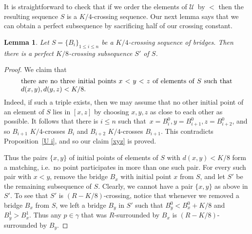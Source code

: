 \documentclass[a4paper]{article}
\newtheorem{lemma}[proposition]{Lemma}
\newcommand{\cu}{\ensuremath{\mathcal U}}
\newcommand{\Prr}[1]{Pro\-position~\ref{#1}}
\newcommand{\st}{such that}
\newcommand{\labtequ}[2]{\begin{equation} \label{#1} 	\begin{minipage}[c]{0.9\textwidth}  #2 \end{minipage} \ignorespacesafterend \end{equation} }
\begin{document}
\smallskip
It is straightforward to check that if we order the elements of \cu\ by $<$ then the resulting sequence $S$ is a $K/4$-crossing sequence. Our next lemma says that we can obtain a perfect subsequence by sacrificing half of our crossing constant.
\begin{lemma} \label{initials} 
Let $S= \{B_i\}_{1\leq i \leq n}$ be a $K/4$-crossing sequence of bridges.  Then there is a perfect $K/8$-crossing subsequence $S'$ of $S$. \end{lemma}
\begin{proof}
We claim that 
\labtequ{xyz}{there are no three  initial points $x < y < z$ of elements of $S$ \st\ $d(x,y), d(y,z) < K/8$.} Indeed, if such a triple exists, then we may assume that no other initial point of an element of $S$ lies in $[x,z]$ by choosing $x,y,z$ as close to each other as possible. It follows that there is $i\leq n$ \st\ $x= B_i^0, y= B_{i+1}^0, z= B_{i+2}^0$, and so $B_{i+1}$ $K/4$-crosses $B_i$ and $B_{i+2}$ $K/4$-crosses $B_{i+1}$. This contradicts \Prr{U i}, and so our claim \eqref{xyz} is proved.

Thus the pairs $\{x,y\}$ of initial points of elements of $S$ with $d(x,y) < K/8$ form a matching, i.e.\ no point participates in more than one such pair. For every such pair with $x<y$, remove the bridge $B_x$ with initial point $x$ from $S$, and let  $S'$ be the remaining subsequence of $S$. Clearly, we cannot have a pair $\{x,y\}$ as above in $S'$. To see that $S'$ is $(R-K/8)$-crossing, notice that whenever we removed a bridge $B_x$ from $S$, we left a bridge $B_y$ in $S'$ such that $B_y^0 < B_x^0 + K/8$ and  $B_y^1 > B_x^1$. Thus any $p\in \gamma$ that was $R$-surrounded by $B_x$ is $(R-K/8)$-surrounded by $B_y$.
\end{proof}
\end{document}
